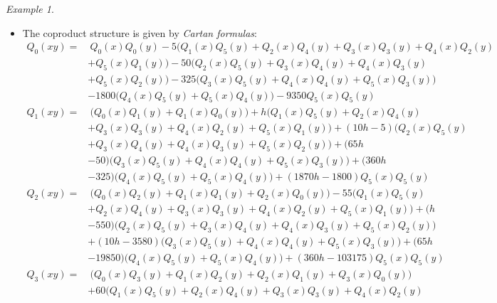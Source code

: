 \documentclass{gtpart}
\theoremstyle{definition}
\theoremstyle{remark}
\newtheorem{ex}[thm]{Example}
\renewcommand{\=}{\approx}
\renewcommand{\-}{\sim}
\numberwithin{equation}{section}
\numberwithin{thm}{section}
\begin{document}
\begin{ex}
\begin{itemize}
  \item The coproduct structure is given by {\em Cartan formulas}: 
  \begin{equation*}
   \begin{split}
    Q_0(x y) = & ~ Q_0(x) Q_0(y) - 5 \big( Q_1(x) Q_5(y) + Q_2(x) Q_4(y) + Q_3(x) Q_3(y) + Q_4(x) Q_2(y) \\
               & + Q_5(x) Q_1(y) \big) - 50 \big( Q_2(x) Q_5(y) + Q_3(x) Q_4(y) + Q_4(x) Q_3(y) \\
               & + Q_5(x) Q_2(y) \big) - 325 \big( Q_3(x) Q_5(y) + Q_4(x) Q_4(y) + Q_5(x) Q_3(y) \big) \\
               & - 1800 \big( Q_4(x) Q_5(y) + Q_5(x) Q_4(y) \big) - 9350 Q_5(x) Q_5(y) 
   \end{split}
  \end{equation*}
  \begin{equation*}
   \begin{split}
    Q_1(x y) = & ~ \big( Q_0(x) Q_1(y) + Q_1(x) Q_0(y) \big) + h \big( Q_1(x) Q_5(y) + Q_2(x) Q_4(y) \\
               & + Q_3(x) Q_3(y) + Q_4(x) Q_2(y) + Q_5(x) Q_1(y) \big) + (10 h - 5) \big( Q_2(x) Q_5(y) \\
               & + Q_3(x) Q_4(y) + Q_4(x) Q_3(y) + Q_5(x) Q_2(y) \big) + (65 h \\
               & - 50) \big( Q_3(x) Q_5(y) + Q_4(x) Q_4(y) + Q_5(x) Q_3(y) \big) + (360 h \\
               & - 325) \big( Q_4(x) Q_5(y) + Q_5(x) Q_4(y) \big) + (1870 h - 1800) Q_5(x) Q_5(y) \\
    Q_2(x y) = & ~ \big( Q_0(x) Q_2(y) + Q_1(x) Q_1(y) + Q_2(x) Q_0(y) \big) - 55 \big( Q_1(x) Q_5(y) \\
               & + Q_2(x) Q_4(y) + Q_3(x) Q_3(y) + Q_4(x) Q_2(y) + Q_5(x) Q_1(y) \big) + (h \\
               & - 550) \big( Q_2(x) Q_5(y) + Q_3(x) Q_4(y) + Q_4(x) Q_3(y) + Q_5(x) Q_2(y) \big) \\
               & + (10 h - 3580) \big( Q_3(x) Q_5(y) + Q_4(x) Q_4(y) + Q_5(x) Q_3(y) \big) + (65 h \\
               & - 19850) \big( Q_4(x) Q_5(y) + Q_5(x) Q_4(y) \big) + (360 h - 103175) Q_5(x) Q_5(y) \\
    Q_3(x y) = & ~ \big( Q_0(x) Q_3(y) + Q_1(x) Q_2(y) + Q_2(x) Q_1(y) + Q_3(x) Q_0(y) \big) \\
               & + 60 \big( Q_1(x) Q_5(y) + Q_2(x) Q_4(y) + Q_3(x) Q_3(y) + Q_4(x) Q_2(y) \\

\end{split}
\end{equation*}
\end{itemize}
\end{ex}
\end{document}
